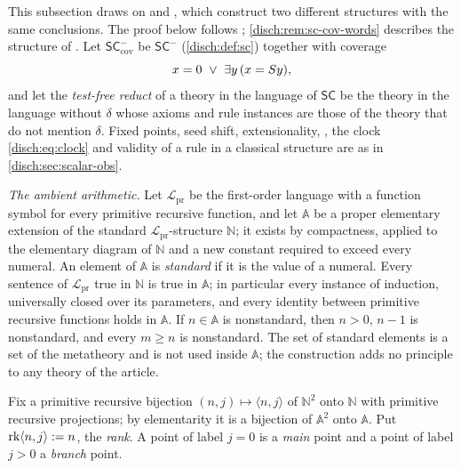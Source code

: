 This subsection draws on  and
, which construct two different structures with
the same conclusions. The proof below follows ;
\cref{disch:rem:sc-cov-words} describes the structure of
. Let $\mathsf{SC}^{-}_{\mathrm{cov}}$ be
$\mathsf{SC}^{-}$ (\cref{disch:def:sc}) together with coverage
\begin{equation}
 x=0\ \lor\ \exists y\,(x=S y),
 \label{disch:eq:sc-cov}
\end{equation}
and let the \emph{test-free reduct} of a theory in the language of
$\mathsf{SC}$ be the theory in the language without $\delta$ whose axioms and
rule instances are those of the theory that do not mention $\delta$. Fixed
points, seed shift, extensionality, , the clock
\eqref{disch:eq:clock} and validity of a rule in a classical structure are as
in \cref{disch:sec:scalar-obs}.

\emph{The ambient arithmetic.} Let $\mathcal L_{\mathrm{pr}}$ be the
first-order language with a function symbol for every primitive recursive
function, and let $\mathbb A$ be a proper elementary extension of the
standard $\mathcal L_{\mathrm{pr}}$-structure $\mathbb N$; it exists by
compactness, applied to the elementary diagram of $\mathbb N$ and a new
constant required to exceed every numeral. An element of $\mathbb A$ is
\emph{standard} if it is the value of a numeral. Every sentence of
$\mathcal L_{\mathrm{pr}}$ true in $\mathbb N$ is true in $\mathbb A$; in
particular every instance of induction, universally closed over its
parameters, and every identity between primitive recursive functions holds
in $\mathbb A$. If $n\in\mathbb A$ is nonstandard, then $n>0$, $n-1$ is
nonstandard, and every $m\ge n$ is nonstandard. The set of standard elements
is a set of the metatheory and is not used inside $\mathbb A$; the
construction adds no principle to any theory of the article.

Fix a primitive recursive bijection $(n,j)\mapsto\langle n,j\rangle$ of
$\mathbb N^2$ onto $\mathbb N$ with primitive recursive projections; by
elementarity it is a bijection of $\mathbb A^2$ onto $\mathbb A$. Put
$\mathrm{rk}\langle n,j\rangle\mathrel{:=} n$, the \emph{rank}. A point of label
$j=0$ is a \emph{main} point and a point of label $j>0$ a \emph{branch}
point.

